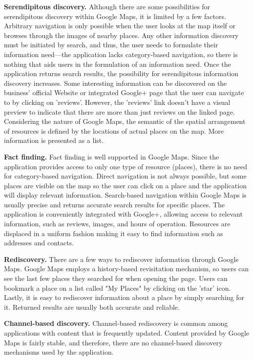{{\textbf{Serendipitous discovery.} Although there are some possibilities for serendipitous discovery within Google Maps, it is limited by a few factors. Arbitrary navigation is only possible when the user looks at the map itself or browses through the images of nearby places. Any other information discovery must be initiated by search, and thus, the user needs to formulate their information need---the application lacks category-based navigation, so there is nothing that aids users in the formulation of an information need. Once the application returns search results, the possibility for serendipitous information discovery increases. Some interesting information can be discovered on the business' official Website or integrated Google+ page that the user can navigate to by clicking on 'reviews'. However, the 'reviews' link doesn't have a visual preview to indicate that there are more than just reviews on the linked page. Considering the nature of Google Maps, the semantic of the spatial arrangement of resources is defined by the locations of actual places on the map. More information is presented as a list. 

\textbf{Fact finding.} Fact finding is well supported in Google Maps. Since the application provides access to only one type of resource (places), there is no need for category-based navigation. Direct navigation is not always possible, but some places are visible on the map so the user can click on a place and the application will display relevant information. Search-based navigation within Google Maps is usually precise and returns accurate search results for specific places. The application is conveniently integrated with Google+, allowing access to relevant information, such as reviews, images, and hours of operation. Resources are displaced in a uniform fashion making it easy to find information such as addresses and contacts. 

\textbf{Rediscovery.} There are a few ways to rediscover information through Google Maps. Google Maps employs a history-based revisitation mechanism, so users can see the last few places they searched for when opening the page. Users can bookmark a place on a list called "My Places" by clicking on the 'star' icon. Lastly, it is easy to rediscover information about a place by simply searching for it. Returned results are usually both accurate and reliable.

\textbf{Channel-based discovery.} Channel-based rediscovery is common among applications with content that is frequently updated. Content provided by Google Maps is fairly stable, and therefore, there are no channel-based discovery mechanisms used by the application.

}}

